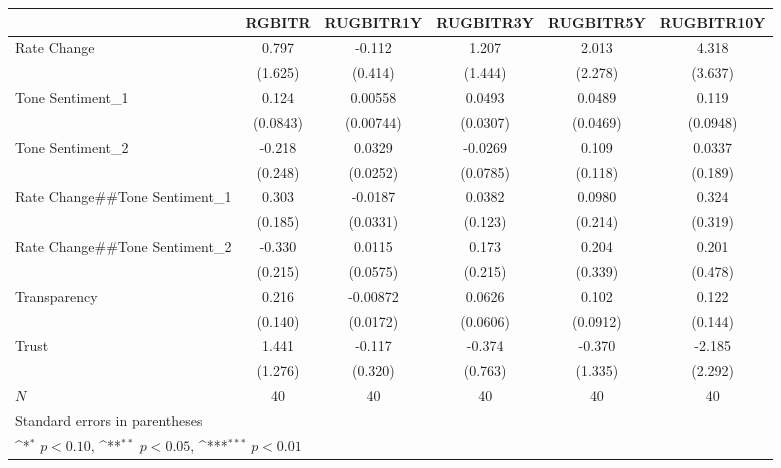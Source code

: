 {
\def\sym#1{\ifmmode^{#1}\else\(^{#1}\)\fi}
\begin{tabular}{l*{5}{c}}
\hline\hline
            &\multicolumn{1}{c}{RGBITR}&\multicolumn{1}{c}{RUGBITR1Y}&\multicolumn{1}{c}{RUGBITR3Y}&\multicolumn{1}{c}{RUGBITR5Y}&\multicolumn{1}{c}{RUGBITR10Y}\\
\hline
Rate Change &       0.797         &      -0.112         &       1.207         &       2.013         &       4.318         \\
            &     (1.625)         &     (0.414)         &     (1.444)         &     (2.278)         &     (3.637)         \\
[1em]
Tone Sentiment\_{1}&       0.124         &     0.00558         &      0.0493         &      0.0489         &       0.119         \\
            &    (0.0843)         &   (0.00744)         &    (0.0307)         &    (0.0469)         &    (0.0948)         \\
[1em]
Tone Sentiment\_{2}&      -0.218         &      0.0329         &     -0.0269         &       0.109         &      0.0337         \\
            &     (0.248)         &    (0.0252)         &    (0.0785)         &     (0.118)         &     (0.189)         \\
[1em]
Rate Change##Tone Sentiment\_{1}&       0.303         &     -0.0187         &      0.0382         &      0.0980         &       0.324         \\
            &     (0.185)         &    (0.0331)         &     (0.123)         &     (0.214)         &     (0.319)         \\
[1em]
Rate Change##Tone Sentiment\_{2}&      -0.330         &      0.0115         &       0.173         &       0.204         &       0.201         \\
            &     (0.215)         &    (0.0575)         &     (0.215)         &     (0.339)         &     (0.478)         \\
[1em]
Transparency&       0.216         &    -0.00872         &      0.0626         &       0.102         &       0.122         \\
            &     (0.140)         &    (0.0172)         &    (0.0606)         &    (0.0912)         &     (0.144)         \\
[1em]
Trust       &       1.441         &      -0.117         &      -0.374         &      -0.370         &      -2.185         \\
            &     (1.276)         &     (0.320)         &     (0.763)         &     (1.335)         &     (2.292)         \\
\hline
\(N\)       &          40         &          40         &          40         &          40         &          40         \\
\hline\hline
\multicolumn{6}{l}{\footnotesize Standard errors in parentheses}\\
\multicolumn{6}{l}{\footnotesize \sym{*} \(p<0.10\), \sym{**} \(p<0.05\), \sym{***} \(p<0.01\)}\\
\end{tabular}
}
